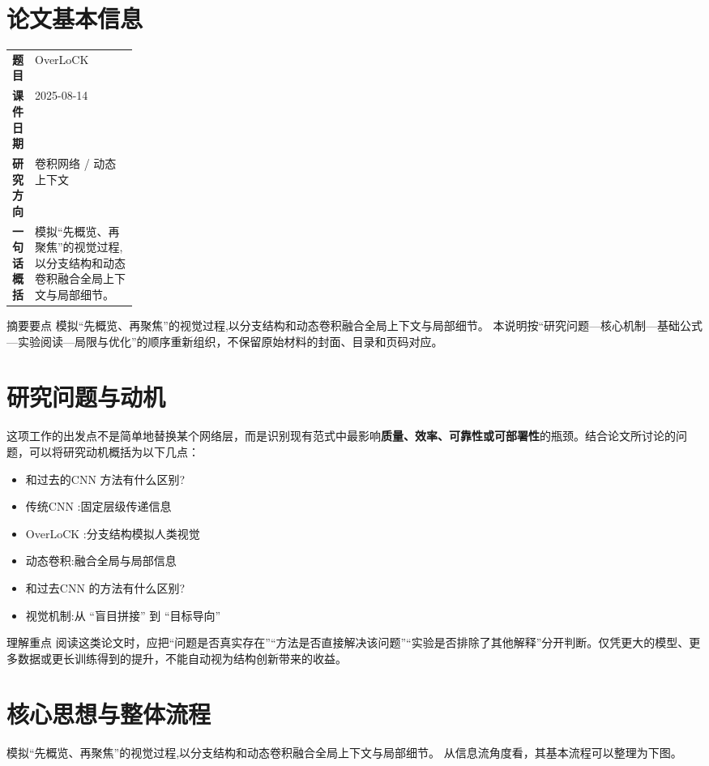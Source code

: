 \documentclass[UTF8,11pt,a4paper]{ctexart}
\newcommand{\term}[1]{\textbf{\textcolor{mainblue}{#1}}}
\begin{document}
\section{论文基本信息}
\begin{center}
\begin{tabularx}{0.94\linewidth}{>{\bfseries}p{0.18\linewidth}X}
\toprule
题目 & OverLoCK\\
课件日期 & 2025-08-14\\
研究方向 & 卷积网络 / 动态上下文\\
一句话概括 & 模拟“先概览、再聚焦”的视觉过程,以分支结构和动态卷积融合全局上下文与局部细节。\\
\bottomrule
\end{tabularx}
\end{center}

\begin{infobox}{摘要要点}
模拟“先概览、再聚焦”的视觉过程,以分支结构和动态卷积融合全局上下文与局部细节。 本说明按“研究问题—核心机制—基础公式—实验阅读—局限与优化”的顺序重新组织，不保留原始材料的封面、目录和页码对应。
\end{infobox}

\section{研究问题与动机}
这项工作的出发点不是简单地替换某个网络层，而是识别现有范式中最影响\term{质量、效率、可靠性或可部署性}的瓶颈。结合论文所讨论的问题，可以将研究动机概括为以下几点：
\begin{itemize}
\item 和过去的CNN 方法有什么区别?
\item 传统CNN :固定层级传递信息
\item OverLoCK :分支结构模拟人类视觉
\item 动态卷积:融合全局与局部信息
\item 和过去CNN 的方法有什么区别?
\item 视觉机制:从 “盲目拼接” 到 “目标导向”
\end{itemize}

\begin{notebox}{理解重点}
阅读这类论文时，应把“问题是否真实存在”“方法是否直接解决该问题”“实验是否排除了其他解释”分开判断。仅凭更大的模型、更多数据或更长训练得到的提升，不能自动视为结构创新带来的收益。
\end{notebox}

\section{核心思想与整体流程}
模拟“先概览、再聚焦”的视觉过程,以分支结构和动态卷积融合全局上下文与局部细节。 从信息流角度看，其基本流程可以整理为下图。
\end{document}
